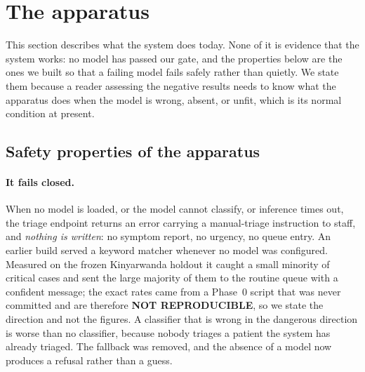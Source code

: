 %
%

\section{The apparatus}
\label{sec:system}

This section describes what the system does today. None of it is evidence that
the system works: no model has passed our gate, and the properties below are the
ones we built so that a failing model fails safely rather than quietly. We state
them because a reader assessing the negative results needs to know what the
apparatus does when the model is wrong, absent, or unfit, which is its normal
condition at present.

\subsection{Safety properties of the apparatus}

\paragraph{It fails closed.} When no model is loaded, or the model cannot
classify, or inference times out, the triage endpoint returns an error carrying a
manual-triage instruction to staff, and \emph{nothing is written}: no symptom
report, no urgency, no queue entry. An earlier build served a keyword matcher
whenever no model was configured. Measured on the frozen Kinyarwanda holdout it
caught a small minority of critical cases and sent the large majority of them to
the routine queue with a confident message; the exact rates came from a Phase~0
script that was never committed and are therefore \textbf{NOT REPRODUCIBLE}, so
we state the direction and not the figures. A classifier that is wrong in the dangerous direction is
worse than no classifier, because nobody triages a patient the system has already
triaged. The fallback was removed, and the absence of a model now produces a
refusal rather than a guess.

